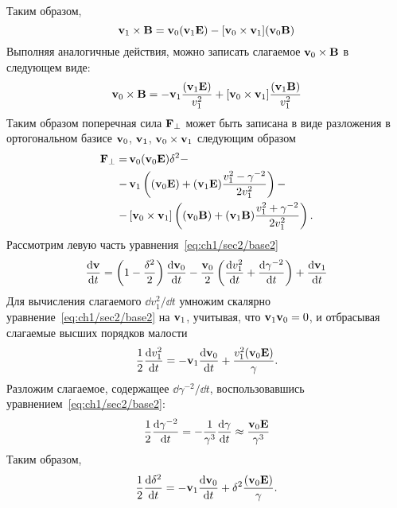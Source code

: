 Таким образом,
\begin{equation}
    \vb{v}_1 \times \vb{B} = \vb{v}_0 (\vb{v}_1 \vb{E}) - [\vb{v}_0 \times \vb{v}_1] (\vb{v}_0 \vb{B})
\end{equation}
Выполняя аналогичные действия, можно записать слагаемое $\vb{v}_0 \times \vb{B}$ в следующем виде:
\begin{equation}
    \vb{v}_0 \times \vb{B} = -\vb{v}_1 \frac{(\vb{v}_1 \vb{E})}{v_1^2} + [\vb{v}_0\times\vb{v}_1] \frac{(\vb{v}_1 \vb{B})}{v_1^2}
\end{equation}
Таким образом поперечная сила $\vb{F}_\perp$ может быть записана в виде разложения в ортогональном базисе $\vb{v}_0$, $\vb{v}_1$, $\vb{v}_0\times\vb{v}_1$ следующим образом
\begin{equation}
    \label{eq:ch1/sec4/fperp}
    \begin{aligned}
        \vb{F}_\perp = &\,\vb{v}_0 (\vb{v}_0 \vb{E}) \delta^2 -\\
                     - &\,\vb{v}_1 \left( (\vb{v}_0 \vb{E}) + (\vb{v}_1 \vb{E})\frac{v_1^2 - \gamma^{-2} }{2v_1^2} \right) -\\
                     - &\,[\vb{v}_0\times\vb{v}_1] \left( (\vb{v}_0 \vb{B}) + (\vb{v}_1 \vb{B}) \frac{v_1^2 + \gamma^{-2}}{2v_1^2}\right) .
    \end{aligned}
\end{equation}
Рассмотрим левую часть уравнения~\eqref{eq:ch1/sec2/base2}
\begin{equation}
    \label{eq:ch1/sec4/2nd_order_A}
    \dv{\vb{v}}{t} = \left( 1 - \frac{\delta^2}{2} \right)\dv{\vb{v}_0}{t} - \frac{\vb{v}_0}{2}\left( \dv{v_1^2}{t}+ \dv{\gamma^{-2}}{t} \right) + \dv{\vb{v}_1}{t} 
\end{equation}
Для вычисления слагаемого $\dd v_1^2/\dd t$ умножим скалярно уравнение~\eqref{eq:ch1/sec2/base2} на $\vb{v}_1$, учитывая, что $\vb{v}_1 \vb{v}_0=0$, и отбрасывая слагаемые высших порядков малости
\begin{equation}
    \frac{1}{2} \dv{v_1^2}{t} = - \vb{v}_1\dv{\vb{v}_0}{t} + \frac{v_1^2(\vb{v}_0 \vb{E})}{\gamma}.
\end{equation}
Разложим слагаемое, содержащее $\dd \gamma^{-2} /\dd t$, воспользовавшись уравнением~\eqref{eq:ch1/sec2/base2}:
\begin{align}
    \label{eq:ch1/sec4/dg2dt}
    \frac{1}{2}\dv{\gamma^{-2}}{t} = -\frac{1}{\gamma^3}\dv{\gamma}{t} \approx \frac{\vb{v}_0\vb{E} }{\gamma^3}
\end{align}
Таким образом,
\begin{equation}
    \label{eq:ch1/sec4/ddeltadt}
    \frac{1}{2}\dv{\delta^2}{t} = - \vb{v}_1\dv{\vb{v}_0}{t} + \delta^2 \frac{(\vb{v}_0 \vb{E})}{\gamma}.
\end{equation}

